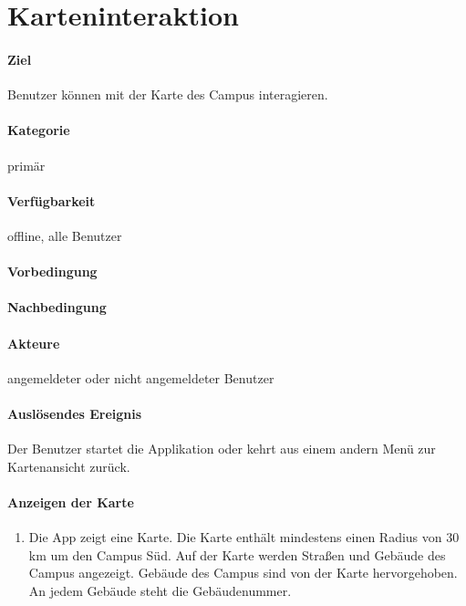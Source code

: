 \section{Karteninteraktion}
\paragraph{Ziel}
Benutzer können mit der Karte des Campus interagieren.
\paragraph{Kategorie}
primär
\paragraph{Verfügbarkeit}
offline, alle Benutzer
\paragraph{Vorbedingung}

\paragraph{Nachbedingung}

\paragraph{Akteure}
angemeldeter oder nicht angemeldeter Benutzer
\paragraph{Auslösendes Ereignis}
Der Benutzer startet die Applikation oder kehrt aus einem andern Menü zur Kartenansicht zurück.
\paragraph{Anzeigen der Karte}
\begin{enumerate}[start=10, label=\textbf{/FA\arabic*/}, align=left]
    \item Die App zeigt eine Karte. Die Karte enthält mindestens einen Radius von 30 km um den Campus Süd. Auf der Karte werden Straßen und Gebäude des Campus angezeigt. Gebäude des Campus sind von der Karte hervorgehoben. An jedem Gebäude steht die Gebäudenummer.
\end{enumerate}
